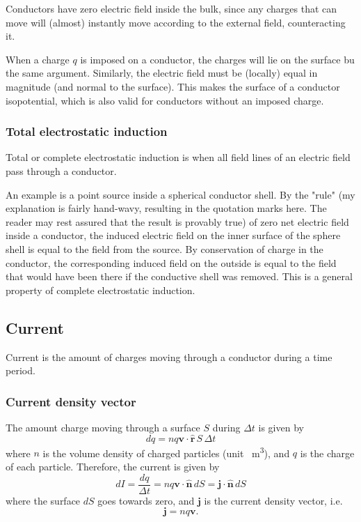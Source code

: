 \documentclass[a4paper, 12pt]{article}
\renewcommand{\vec}[1]{\mathbf{#1}}
\renewcommand{\j}{\ensuremath{\vec{j}}}
\let\tmp\hat
\renewcommand{\hat}[1]{\vec{\tmp{#1}}}
\begin{document}
        Conductors have zero electric field inside the bulk, 
        since any charges that can move will (almost) instantly move according to the external field, counteracting it. 
        
        When a charge $q$ is imposed on a conductor, the charges will lie on the surface bu the same argument. 
        Similarly, the electric field must be (locally) equal in magnitude (and normal to the surface). 
        This makes the surface of a conductor isopotential, which is also valid for conductors without an imposed charge. 

    \subsubsection{Total electrostatic induction}
        Total or complete electrostatic induction is when all field lines of an electric field pass through a conductor.
        
        An example is a point source inside a spherical conductor shell. 
        By the "rule" (my explanation is fairly hand-wavy, resulting in the quotation marks here. 
        The reader may rest assured that the result is provably true) of zero net electric field inside a conductor, 
        the induced electric field on the inner surface of the sphere shell is equal to the field from the source. 
        By conservation of charge in the conductor, 
        the corresponding induced field on the outside is equal to the field that would have been there if the conductive shell was removed. 
        This is a general property of complete electrostatic induction. 
  
\subsection{Current}
    Current is the amount of charges moving through a conductor during a time period. 
    \subsubsection{Current density vector}
        The amount charge moving through a surface $S$ during $\Delta t$ is given by
        \begin{equation}
            dq = nq\vec{v}\cdot \hat{r}\,S \,\Delta t
        \end{equation}
        where $n$ is the volume density of charged particles (unit \si{\per\metre\cubed}), and $q$ is the charge of each particle.
        Therefore, the current is given by
        \begin{equation}
            dI = \frac{dq}{\Delta t} = nq\vec{v}\cdot\hat{n}\, dS = \j\cdot\hat{n}\, dS
        \end{equation}
        where the surface $dS$ goes towards zero, and $\j$ is the current density vector, i.e.
        \begin{equation}
            \j = nq\vec{v}.
        \end{equation}
        
\end{document}
